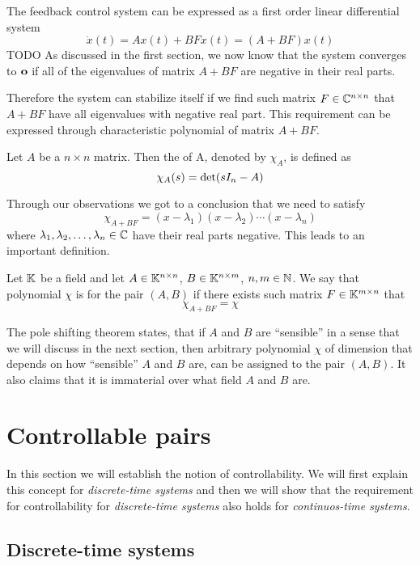 The feedback control system can be expressed as a first order linear differential system $$\dot{x}(t)=Ax(t)+BFx(t)=(A+BF)x(t)$$ TODO As discussed in the first section, we now know that the system converges to $\textbf{o}$ if all of the eigenvalues of matrix $A+BF$ are negative in their real parts. 

Therefore the system can stabilize itself if we find such matrix $F \in \mathbb{C}^{n \times n}$ that $A+BF$ have all eigenvalues with negative real part. This requirement can be expressed through characteristic polynomial of matrix $A+BF$.

\begin{definition}
	Let $A$ be a $n\times n$ matrix. Then the  of A, denoted by $\chi_A$, is defined as $$\chi_A(s)=\textnormal{det}(sI_n-A)$$
\end{definition}

Through our observations we got to a conclusion that we need to satisfy $$\chi_{A+BF}=(x-\lambda_1)(x-\lambda_2)\cdots(x-\lambda_n)$$ where $\lambda_1,\lambda_2,\ldots,\lambda_n \in \mathbb{C}$ have their real parts negative. This leads to an important definition.

\begin{definition}
    Let $\mathbb{K}$ be a field and let $A \in \mathbb{K}^{n \times n}$, $B \in \mathbb{K}^{n \times m}$, $n,m \in \mathbb{N}$. We say that polynomial $\chi$ is  for the pair $(A,B)$ if there exists such matrix $F\in\mathbb{K}^{m \times n}$ that $$\chi_{A+BF}=\chi$$
\end{definition}

The pole shifting theorem states, that if $A$ and $B$ are ``sensible'' in a sense that we will discuss in the next section, then arbitrary polynomial $\chi$ of dimension that depends on how ``sensible'' $A$ and $B$ are, can be assigned to the pair $(A,B)$. It also claims that it is immaterial over what field $A$ and $B$ are.

\section{Controllable pairs}

In this section we will establish the notion of controllability. We will first explain this concept for \textit{discrete-time systems} and then we will show that the requirement for controllability for \textit{discrete-time systems} also holds for \textit{continuos-time systems}.

\subsection{Discrete-time systems}

